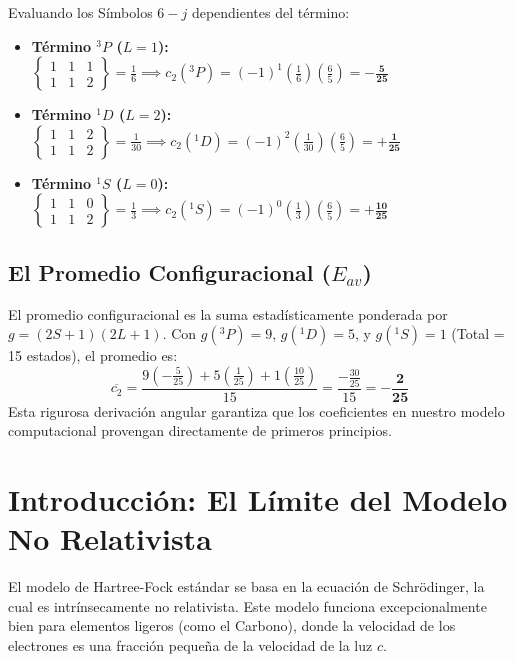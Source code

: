 \documentclass[11pt,a4paper]{article}
\begin{document}
Evaluando los Símbolos $6-j$ dependientes del término:
\begin{itemize}
    \item \textbf{Término $^3P$ ($L=1$):} $\begin{Bmatrix} 1 & 1 & 1 \\ 1 & 1 & 2 \end{Bmatrix} = \frac{1}{6} \implies c_2(^3P) = (-1)^1 \left(\frac{1}{6}\right) \left(\frac{6}{5}\right) = \mathbf{-\frac{5}{25}}$
    \item \textbf{Término $^1D$ ($L=2$):} $\begin{Bmatrix} 1 & 1 & 2 \\ 1 & 1 & 2 \end{Bmatrix} = \frac{1}{30} \implies c_2(^1D) = (-1)^2 \left(\frac{1}{30}\right) \left(\frac{6}{5}\right) = \mathbf{+\frac{1}{25}}$
    \item \textbf{Término $^1S$ ($L=0$):} $\begin{Bmatrix} 1 & 1 & 0 \\ 1 & 1 & 2 \end{Bmatrix} = \frac{1}{3} \implies c_2(^1S) = (-1)^0 \left(\frac{1}{3}\right) \left(\frac{6}{5}\right) = \mathbf{+\frac{10}{25}}$
\end{itemize}

\subsection{El Promedio Configuracional ($E_{av}$)}
El promedio configuracional es la suma estadísticamente ponderada por $g = (2S+1)(2L+1)$.
Con $g(^3P) = 9$, $g(^1D) = 5$, y $g(^1S) = 1$ (Total = 15 estados), el promedio es:
\begin{equation}
\overline{c_2} = \frac{9(-\frac{5}{25}) + 5(\frac{1}{25}) + 1(\frac{10}{25})}{15} = \frac{-\frac{30}{25}}{15} = \mathbf{-\frac{2}{25}}
\end{equation}
Esta rigurosa derivación angular garantiza que los coeficientes en nuestro modelo computacional provengan directamente de primeros principios.
\section{Introducción: El Límite del Modelo No Relativista}
El modelo de Hartree-Fock estándar se basa en la ecuación de Schrödinger, la cual es intrínsecamente no relativista. Este modelo funciona excepcionalmente bien para elementos ligeros (como el Carbono), donde la velocidad de los electrones es una fracción pequeña de la velocidad de la luz $c$. 
\end{document}
